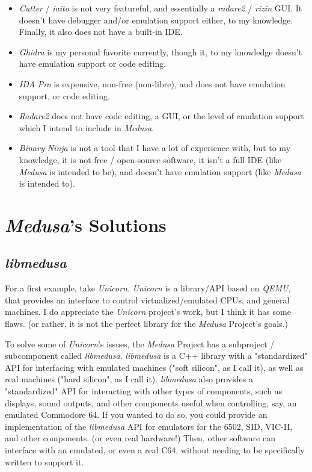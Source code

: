 \documentclass{report}
\begin{document}
	\begin{itemize}
		\item \textit{Cutter} / \textit{iaito} is not very featureful, and
		essentially a \textit{radare2} / \textit{rizin} GUI. It doesn't have
		debugger and/or emulation support either, to my knowledge. Finally, it
		also does not have a built-in IDE.
		\item \textit{Ghidra} is my personal favorite currently, though it, to
		my knowledge doesn't have emulation support or code editing.
		\item \textit{IDA Pro} is expensive, non-free (non-libre), and does not
		have emulation support, or code editing.
		\item \textit{Radare2} does not have code editing, a GUI, or the level
		of emulation support which I intend to include in \textit{Medusa}.
		\item \textit{Binary Ninja} is not a tool that I have a lot of
		experience with, but to my knowledge, it is not free / open-source
		software, it isn't a full IDE (like \textit{Medusa} is intended to be),
		and doesn't have emulation support (like \textit{Medusa} is intended
		to).
	\end{itemize}

	\section{\textit{Medusa}'s Solutions}
	\subsection{\textit{libmedusa}} \label{solution_libmedusa1}
	For a first example, take \textit{Unicorn}. \textit{Unicorn} is a
	library/API based on \textit{QEMU}, that provides an interface to control
	virtualized/emulated CPUs, and general machines.\cite{unicorn_github} I do
	appreciate the \textit{Unicorn} project's work, but I think it has some
	flaws. (or rather, it is not the perfect library for the \textit{Medusa}
	Project's goals.)

	To solve some of \textit{Unicorn}'s issues, the \textit{Medusa} Project has
	a subproject / subcomponent called \textit{libmedusa}. \textit{libmedusa} is
	a C++ library with a "standardized" API for interfacing with emulated
	machines ("soft silicon", as I call it), as well as real machines ("hard
	silicon", as I call it). \textit{libmedusa} also provides a "standardized"
	API for interacting with other types of components, such as displays, sound
	outputs, and other components useful when controlling, say, an emulated
	Commodore 64. If you wanted to do so, you could provide an implementation of
	the \textit{libmedusa} API for emulators for the 6502, SID, VIC-II, and
	other components. (or even real hardware!) Then, other software can
	interface with an emulated, or even a real C64, without needing to be
	specifically written to support it.
\end{document}
